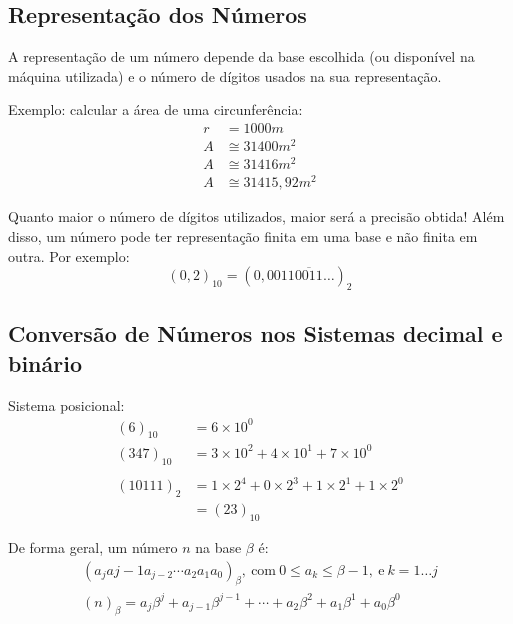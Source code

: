 \documentclass[a4paper,oneside,article,table]{article}
\begin{document}
    \subsection{Representação dos Números}
    A representação de um número depende da base escolhida (ou disponível na máquina utilizada) e o número de dígitos usados na sua representação.

    Exemplo: calcular a área de uma circunferência:
    \begin{align*}
        r &= 1000 m\\
        A &\cong 31400 m^2\\
        A &\cong 31416 m^2\\
        A &\cong 31415,92 m^2
    \end{align*}

    Quanto maior o número de dígitos utilizados, maior será a precisão obtida! Além disso, um número pode ter representação finita em uma base e não finita em outra. Por exemplo:
    \[{(0,2)}_{10} = {(0,0011\overline{0011}\ldots)}_2\]

    \subsection{Conversão de Números nos Sistemas decimal e binário}
    Sistema posicional:
    \begin{align*}
        {(6)}_{10} &= 6\times10^0\\
        {(347)}_{10} &= 3\times10^2 + 4\times10^1 + 7\times10^0\\\\
        {(10111)}_2 &= 1\times2^4 + 0\times2^3 + 1\times2^1 + 1\times2^0\\
        &= {(23)}_{10}
    \end{align*}

    De forma geral, um número $n$ na base $\beta$ é:
    \begin{gather*}
        {(a_j a{j-1} a_{j-2} \cdots a_2 a_1 a_0)}_{\beta},~\mathrm{com}~0 \leq a_k \leq \beta - 1,~\mathrm{e}~k = 1 \ldots j\\
        {(n)}_{\beta}= a_j\beta^j + a_{j-1}\beta^{j-1} + \cdots + a_2\beta^2 + a_1\beta^1 + a_0\beta^0 
    \end{gather*}
\end{document}

